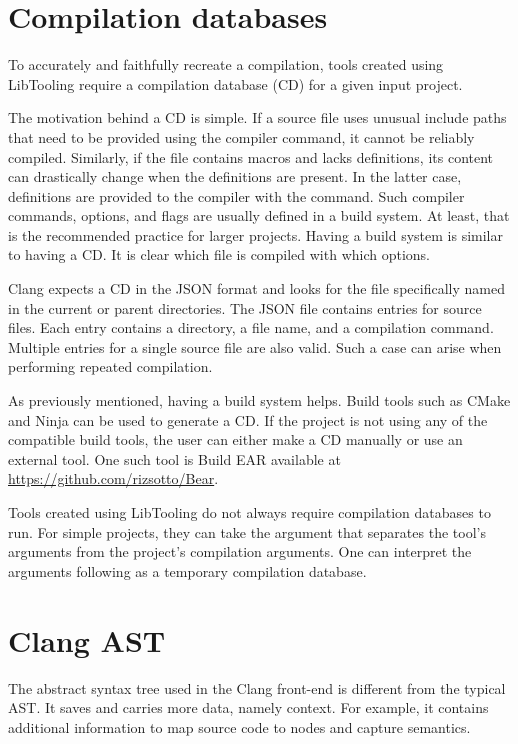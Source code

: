 \section{Compilation databases}

To accurately and faithfully recreate a compilation, tools created using 
LibTooling require a compilation database (CD) for a given input project.

The motivation behind a CD is simple.
If a source file uses unusual include paths that need to be provided 
using the  compiler command, it cannot be reliably compiled.
Similarly, if the file contains macros and lacks definitions, its content 
can drastically change when the definitions are present.
In the latter case, definitions are provided to the compiler 
with the  command.
Such compiler commands, options, and flags are usually defined in a build 
system.
At least, that is the recommended practice for larger projects.
Having a build system is similar to having a CD.
It is clear which file is compiled with which options.

Clang expects a CD in the JSON format and looks for the file specifically
named   in the current or parent 
directories.
The JSON file contains entries for source files.
Each entry contains a directory, a file name, and a compilation command.
Multiple entries for a single source file are also valid.
Such a case can arise when performing repeated compilation.

As previously mentioned, having a build system helps.
Build tools such as CMake and Ninja can be used to generate a CD.
If the project is not using any of the compatible build tools, 
the user can either make a CD manually or use an external tool.
One such tool is Build EAR available at \url{https://github.com/rizsotto/Bear}.

Tools created using LibTooling do not always require compilation databases 
to run.
For simple projects, they can take the \icode{-{}-} argument that separates 
the tool's arguments from the project's compilation arguments.
One can interpret the arguments following \icode{-{}-} as a temporary
compilation database.

\section{Clang AST}

The abstract syntax tree used in the Clang front-end is different 
from the typical AST. 
It saves and carries more data, namely context.  
For example, it contains additional information to map source 
code to nodes and capture semantics. 

